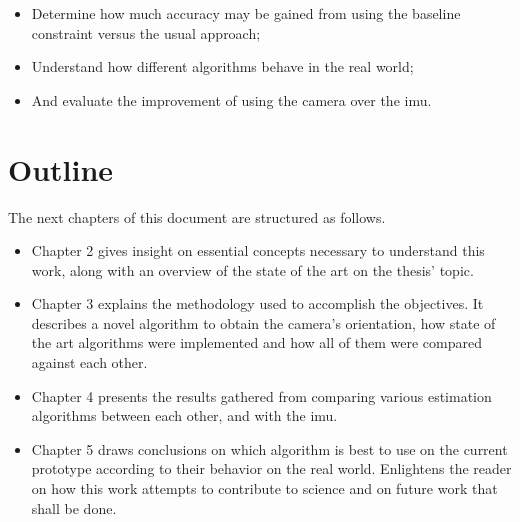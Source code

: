\begin{itemize}
\item Determine how much accuracy may be gained from using the baseline constraint versus the usual approach;
\item Understand how different algorithms behave in the real world;
\item And evaluate the improvement of using the camera over the  \acrshort{imu}.
\end{itemize}

 		
\section{Outline}
\label{cha1:outline}

The next chapters of this document are structured as follows.
\begin{itemize}
\item	Chapter 2 gives insight on essential concepts necessary to understand this work, along with an overview of the state of the art on the thesis' topic.
	
\item	Chapter 3 explains the methodology used to accomplish the objectives. It describes a novel algorithm to obtain the camera's orientation, how state of the art algorithms were implemented and how all of them were compared against each other. 
	
\item	Chapter 4 presents the results gathered from comparing various estimation algorithms between each other, and with the \acrshort{imu}.
	
\item	Chapter 5 draws conclusions on which algorithm is best to use on the current prototype according to their behavior on the real world. Enlightens the reader on how this work attempts to contribute to science and on future work that shall be done.
	
\end{itemize}



